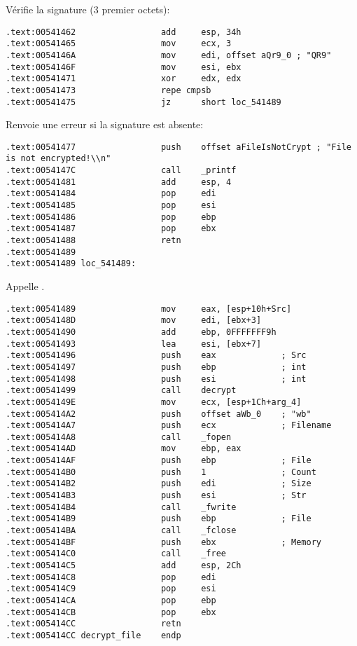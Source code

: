 Vérifie la signature (3 premier octets):

\begin{lstlisting}[style=customasmx86]
.text:00541462                 add     esp, 34h
.text:00541465                 mov     ecx, 3
.text:0054146A                 mov     edi, offset aQr9_0 ; "QR9"
.text:0054146F                 mov     esi, ebx
.text:00541471                 xor     edx, edx
.text:00541473                 repe cmpsb
.text:00541475                 jz      short loc_541489
\end{lstlisting}

Renvoie une erreur si la signature est absente:

\begin{lstlisting}[style=customasmx86]
.text:00541477                 push    offset aFileIsNotCrypt ; "File is not encrypted!\\n"
.text:0054147C                 call    _printf
.text:00541481                 add     esp, 4
.text:00541484                 pop     edi
.text:00541485                 pop     esi
.text:00541486                 pop     ebp
.text:00541487                 pop     ebx
.text:00541488                 retn
.text:00541489
.text:00541489 loc_541489:
\end{lstlisting}

Appelle .

\begin{lstlisting}[style=customasmx86]
.text:00541489                 mov     eax, [esp+10h+Src]
.text:0054148D                 mov     edi, [ebx+3]
.text:00541490                 add     ebp, 0FFFFFFF9h
.text:00541493                 lea     esi, [ebx+7]
.text:00541496                 push    eax             ; Src
.text:00541497                 push    ebp             ; int
.text:00541498                 push    esi             ; int
.text:00541499                 call    decrypt
.text:0054149E                 mov     ecx, [esp+1Ch+arg_4]
.text:005414A2                 push    offset aWb_0    ; "wb"
.text:005414A7                 push    ecx             ; Filename
.text:005414A8                 call    _fopen
.text:005414AD                 mov     ebp, eax
.text:005414AF                 push    ebp             ; File
.text:005414B0                 push    1               ; Count
.text:005414B2                 push    edi             ; Size
.text:005414B3                 push    esi             ; Str
.text:005414B4                 call    _fwrite
.text:005414B9                 push    ebp             ; File
.text:005414BA                 call    _fclose
.text:005414BF                 push    ebx             ; Memory
.text:005414C0                 call    _free
.text:005414C5                 add     esp, 2Ch
.text:005414C8                 pop     edi
.text:005414C9                 pop     esi
.text:005414CA                 pop     ebp
.text:005414CB                 pop     ebx
.text:005414CC                 retn
.text:005414CC decrypt_file    endp
\end{lstlisting}

